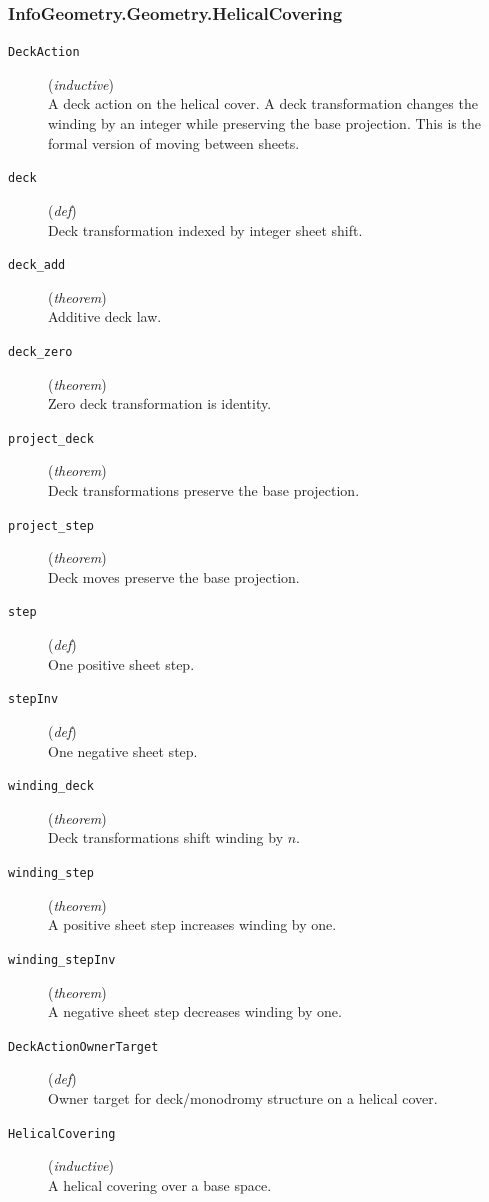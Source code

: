 \documentclass[11pt,a4paper]{article}
\begin{document}
\subsubsection*{InfoGeometry.Geometry.HelicalCovering}
\begin{description}
  \item[\texttt{DeckAction}] (\textit{inductive}) \\ A deck action on the helical cover. 
A deck transformation changes the winding by an integer while preserving the 
base projection.  This is the formal version of moving between sheets.
  \item[\texttt{deck}] (\textit{def}) \\ Deck transformation indexed by integer sheet shift.
  \item[\texttt{deck\_add}] (\textit{theorem}) \\ Additive deck law.
  \item[\texttt{deck\_zero}] (\textit{theorem}) \\ Zero deck transformation is identity.
  \item[\texttt{project\_deck}] (\textit{theorem}) \\ Deck transformations preserve the base projection.
  \item[\texttt{project\_step}] (\textit{theorem}) \\ Deck moves preserve the base projection.
  \item[\texttt{step}] (\textit{def}) \\ One positive sheet step.
  \item[\texttt{stepInv}] (\textit{def}) \\ One negative sheet step.
  \item[\texttt{winding\_deck}] (\textit{theorem}) \\ Deck transformations shift winding by $n$.
  \item[\texttt{winding\_step}] (\textit{theorem}) \\ A positive sheet step increases winding by one.
  \item[\texttt{winding\_stepInv}] (\textit{theorem}) \\ A negative sheet step decreases winding by one.
  \item[\texttt{DeckActionOwnerTarget}] (\textit{def}) \\ Owner target for deck/monodromy structure on a helical cover.
  \item[\texttt{HelicalCovering}] (\textit{inductive}) \\ A helical covering over a base space. 

\end{description}
\end{document}
